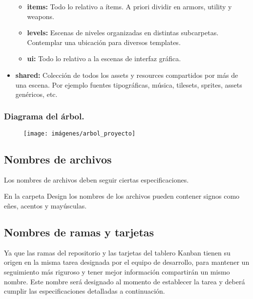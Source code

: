 \begin{itemize}
\begin{itemize}
	\item \textbf{items:} Todo lo relativo a ítems. A priori dividir en armors, utility y weapons.

	\item \textbf{levels:} Escenas de niveles organizadas en distintas subcarpetas. Contemplar una ubicación para diversos templates.

	\item \textbf{ui:} Todo lo relativo a la escenas de interfaz gráfica.
\end{itemize}

\item \textbf{shared:} Colección de todos los assets y resources compartidos por más de una escena. Por ejemplo fuentes tipográficas, música, tilesets, sprites, assets genéricos, etc.
\end{itemize}

\subsubsection*{Diagrama del árbol.}
\begin{figure}[H]
\centering
\texttt{[image: imágenes/arbol\_proyecto]}
\label{fig:arbolproyecto}
\end{figure}









\subsection{Nombres de archivos}\label{organizacion:nombres-de-archivos}

Los nombres de archivos deben seguir ciertas especificaciones.

En la carpeta Design los nombres de los archivos pueden contener signos como eñes, acentos y mayúsculas.

\subsection{Nombres de ramas y tarjetas}\label{organizacion:nombres-de-ramas}
Ya que las ramas del repositorio  y las tarjetas del tablero Kanban tienen su origen en la misma tarea designada por el equipo de desarrollo, para mantener un seguimiento más riguroso y tener mejor información compartirán un mismo nombre. Este nombre será designado al momento de establecer la tarea y deberá cumplir las especificaciones detalladas a continuación.

